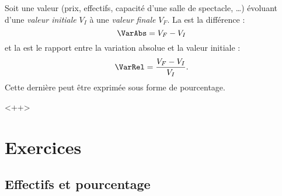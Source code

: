 \begin{definition}
    Soit une valeur (prix, effectifs, capacité d'une salle de spectacle, \ldots) évoluant d'une \emph{valeur initiale} \( V_I\) à une \emph{valeur finale} \( V_F\). La  est la différence :
    \begin{equation}
        \VarAbs=V_F-V_I
    \end{equation}
    et la  est le rapport entre la variation absolue et la valeur initiale :
    \begin{equation}
        \VarRel=\frac{ V_F-V_I }{ V_I }.
    \end{equation}
    Cette dernière peut être exprimée sous forme de pourcentage.
\end{definition}

\begin{Aretenir}
    
\end{Aretenir}
<++>

\section{Exercices}

\subsection{Effectifs et pourcentage}


